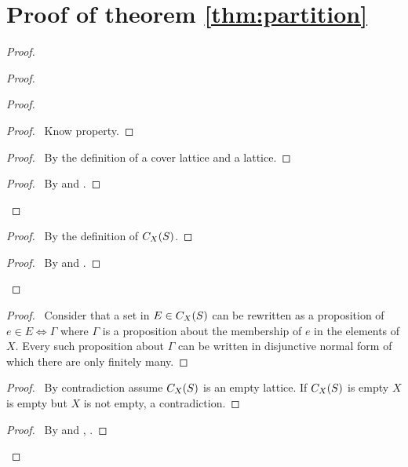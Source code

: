\section{Proof of theorem \ref{thm:partition}}

\partition*

\begin{proof}
    \pf\
    \step{lattice}{$(\clattice{X}{S}, \subseteq, \cup, \cap)$ is a lattice.}
    \begin{proof}
        \begin{proof}
            \begin{proof}
                \pf\ Know property.
            \end{proof}
            \begin{proof}
                \pf\ By the definition of a cover lattice and a lattice.
            \end{proof}
            \qedstep
            \begin{proof}
                \pf\ By  and .
            \end{proof}
        \end{proof}
        \begin{proof}
            \pf\ By the definition of $C_{X}(S)$.
        \end{proof}
        \qedstep
        \begin{proof}
            \pf\ By  and .
        \end{proof}
    \end{proof}
    \begin{proof}
        \pf\ Consider that a set in $E \in C_{X}(S)$ can be rewritten as a proposition of $e \in E \iff \Gamma$ where $\Gamma$ is a proposition about the membership of $e$ in the elements of $X$. Every such proposition about $\Gamma$ can be written in disjunctive normal form of which there are only finitely many.
    \end{proof}
    \begin{proof}
        \pf\ By contradiction assume $C_{X}(S)$ is an empty lattice.
        If $C_{X}(S)$ is empty $X$ is empty but $X$ is not empty, a contradiction.
    \end{proof}
    \qedstep
    \begin{proof}
        \pf\ By  and , .
    \end{proof}
\end{proof}

